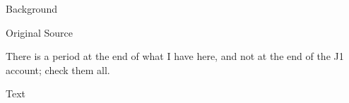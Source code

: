 			\begin{description}
				\item[Background]
			\end{description}
			
			
			\begin{description}
				\item[Original Source]
			\end{description}
			
				
				There is a period at the end of what I have here, and not at the end of the J1 account; check them all.
			
			\begin{description}
				\item[Text]
			\end{description}
			
